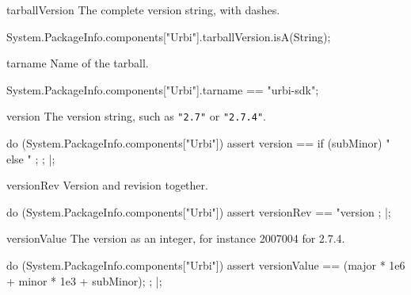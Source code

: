 \begin{urbiscriptapi}
\item[tarballVersion] The complete version string, with dashes.
\begin{urbiassert}
System.PackageInfo.components["Urbi"].tarballVersion.isA(String);
\end{urbiassert}


\item[tarname] Name of the tarball.
\begin{urbiassert}
System.PackageInfo.components["Urbi"].tarname
  == "urbi-sdk";
\end{urbiassert}


\item[version] The version string, such as \lstinline|"2.7"| or
  \lstinline|"2.7.4"|.
\begin{urbiscript}
do (System.PackageInfo.components["Urbi"])
{
  assert
  {
    version ==
      {
        if (subMinor)
          "%
        else
          "%
      };
  };
}|;
\end{urbiscript}


\item[versionRev] Version and revision together.
\begin{urbiscript}
do (System.PackageInfo.components["Urbi"])
{
  assert
  {
    versionRev
    == "version %
  };
}|;
\end{urbiscript}


\item[versionValue] The version as an integer, for instance 2007004 for
  2.7.4.
\begin{urbiscript}
do (System.PackageInfo.components["Urbi"])
{
  assert
  {
    versionValue == (major * 1e6 + minor * 1e3 + subMinor);
  };
}|;
\end{urbiscript}
\end{urbiscriptapi}

